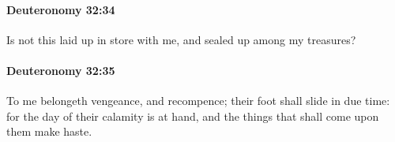 		\paragraph{Deuteronomy 32:34} %
			\label{DEUTERONOMY-32-34}

			Is not this laid up in store with me, and sealed up among my treasures?


		\paragraph{Deuteronomy 32:35} %
			\label{DEUTERONOMY-32-35}

			To me belongeth vengeance, and recompence; their foot shall slide in due time: for the day of their calamity is at hand, and the things that shall come upon them make haste.


